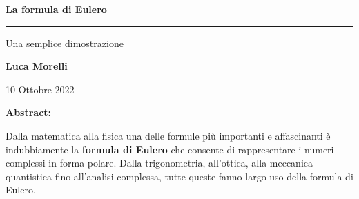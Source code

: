 \begin{center}
	\huge \textbf{La formula di Eulero}
	
	\rule{7cm}{0.4pt} 
	
	\LARGE Una semplice dimostrazione
	
	\vspace{20pt}
	
	\LARGE \textbf{Luca Morelli}
	
	\vspace{5pt}
	
	\LARGE 10 Ottobre 2022
	
\end{center}

\vspace{20pt}

\begin{center}
	\textbf{Abstract:}
\end{center}

Dalla matematica alla fisica una delle formule più importanti e affascinanti è indubbiamente la \textbf{formula di Eulero} che consente di rappresentare i numeri complessi in forma polare. Dalla trigonometria, all'ottica, alla meccanica quantistica fino all'analisi complessa, tutte queste fanno largo uso della formula di Eulero.  

